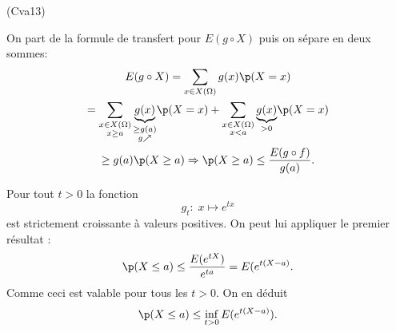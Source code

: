 \begin{tiny}(Cva13)\end{tiny} On part de la formule de transfert pour $E(g\circ X)$ puis on sépare en deux sommes:
\begin{multline*}
  E(g \circ X)
  = 
  \sum_{x \in X(\Omega)}g(x) \p(X=x)\\
  = \sum_{\substack{x \in X(\Omega) \\ x\geq a}}\underset{\substack{\geq g(a) \\ g \nearrow}}{\underbrace{g(x)}} \p(X=x)
  + \sum_{\substack{x \in X(\Omega) \\ x < a}}\underset{> 0}{\underbrace{g(x)}} \p(X=x)\\
  \geq g(a) \p(X \geq a)
  \Rightarrow 
  \p(X\geq a) \leq \frac{E(g\circ f)}{g(a)}.
\end{multline*}

Pour tout $t>0$ la fonction
\[
  g_t:\; x \mapsto e^{tx}
\]
est strictement croissante à valeurs positives. On peut lui appliquer le premier résultat :
\[
  \p(X\leq a) \leq \frac{E(e^{tX})}{e^{ta}}
  = E(e^{t(X-a)}.
\]
Comme ceci est valable pour tous les $t>0$. On en déduit
\[
  \p(X \leq a) \leq \inf_{t >0} E(e^{t(X-a)}).
\]
